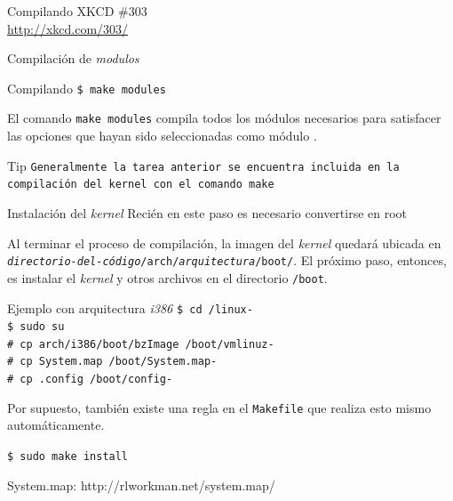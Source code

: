 \begin{frame}{Compilando}
  \large XKCD \#303 \\ \url{http://xkcd.com/303/}
  \begin{center}
   \end{center}
\end{frame}

\begin{frame}{Compilación de \textit{modulos}}
\begin{block}{Compilando}
  \texttt{\$ make modules} 
\end{block}

El comando \texttt{make modules} compila todos los módulos necesarios para satisfacer las opciones que hayan sido seleccionadas como módulo .

\begin{block}{Tip}
\texttt{Generalmente la tarea anterior se encuentra incluida en la compilación del kernel con el comando \texttt{make}}
\end{block}


\end{frame}


\begin{frame}{Instalación del \textit{kernel}}
  \alert{Recién en este paso es necesario convertirse en root}

  Al terminar el proceso de compilación, la imagen del
  \textit{kernel} quedará ubicada en
  \texttt{\textit{directorio-del-código}/arch/\textit{arquitectura}/boot/}. El
  próximo paso, entonces, es instalar el \textit{kernel} y otros archivos
  en el directorio \texttt{/boot}.

  { \tiny
  \begin{block}{Ejemplo con arquitectura \textit{i386}}
    \texttt{\$ cd \KERNELSOURCEPATH/linux-\KERNELVERSION \\
\$ sudo su \\
\# cp arch/i386/boot/bzImage /boot/vmlinuz-\PATCHEDKERNELVERSION \\
\# cp System.map /boot/System.map-\PATCHEDKERNELVERSION \\
\# cp .config /boot/config-\PATCHEDKERNELVERSION}
  \end{block}}
  \vfill \pause

\tiny
  Por supuesto, también existe una regla en el \texttt{Makefile} que
  realiza esto mismo automáticamente.
  { \tiny
  \begin{block}{}
    \texttt{\$ sudo make install}
  \end{block}}
System.map: http://rlworkman.net/system.map/
\end{frame} 

